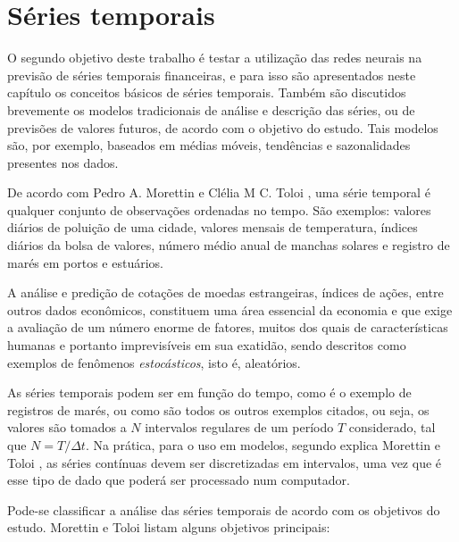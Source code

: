 

\chapter{Séries temporais}
\label{cap:series}

O segundo objetivo deste trabalho é testar a utilização das redes neurais na previsão de séries temporais financeiras, e para isso são apresentados neste capítulo os conceitos básicos de séries temporais. Também são discutidos brevemente os modelos tradicionais de análise e descrição das séries, ou de previsões de valores futuros, de acordo com o objetivo do estudo. Tais modelos são, por exemplo, baseados em médias móveis, tendências e sazonalidades presentes nos dados.

De acordo com Pedro A. Morettin e Clélia M C. Toloi \citep{morettin}, uma série temporal é qualquer conjunto de observações ordenadas no tempo. São exemplos: valores diários de poluição de uma cidade, valores mensais de temperatura, índices diários da bolsa de valores, número médio anual de manchas solares e registro de marés em portos e estuários.

A análise e predição de cotações de moedas estrangeiras, índices de ações, entre outros dados econômicos, constituem uma área essencial da economia e que exige a avaliação de um número enorme de fatores, muitos dos quais de características humanas e portanto imprevisíveis em sua exatidão, sendo descritos como exemplos de fenômenos \emph{estocásticos}, isto é, aleatórios.

As séries temporais podem ser  em função do tempo, como é o exemplo de registros de marés, ou  como são todos os outros exemplos citados, ou seja, os valores são tomados a $N$ intervalos regulares de um período $T$ considerado, tal que $N = T/\Delta t$. Na prática, para o uso em modelos, segundo explica Morettin e Toloi \citep{morettin}, as séries contínuas devem ser discretizadas em intervalos, uma vez que é esse tipo de dado que poderá ser processado num computador.

Pode-se classificar a análise das séries temporais de acordo com os objetivos do estudo. Morettin e Toloi \citep{morettin} listam alguns objetivos principais:

